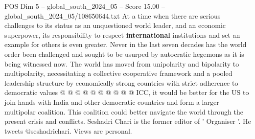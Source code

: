 \begin{textsample}{POS Dim 5 – global\_south\_2024\_05 – Score 15.00 – global\_south\_2024\_05/108650644.txt}
At a time when there are serious challenges to its status as an unquestioned world leader, and an economic superpower, its responsibility to respect \textbf{international} institutions and set an example for others is even greater.
Never in the last seven decades has the world order been challenged and sought to be usurped by autocratic hegemons as it is being witnessed now.
The world has moved from unipolarity and bipolarity to multipolarity, necessitating a collective cooperative framework and a pooled leadership structure by economically strong countries with strict adherence to democratic values @ @ @ @ @ @ @ @ @ @ ICC, it would be better for the US to join hands with India and other democratic countries and form a larger multipolar coalition.
This coalition could better navigate the world through the present crisis and conflicts.
Seshadri Chari is the former editor of ' Organiser '.
He tweets @seshadrichari.
Views are personal.

\end{textsample}
